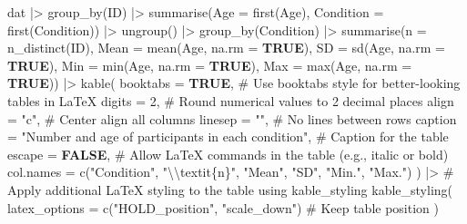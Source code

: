 \documentclass[
  bookmarksnumbered]{article}
\newenvironment{Shaded}{\begin{snugshade}}{\end{snugshade}}
\newcommand{\AttributeTok}[1]{\textcolor[rgb]{0.80,0.80,0.80}{#1}}
\newcommand{\CommentTok}[1]{\textcolor[rgb]{0.50,0.62,0.50}{#1}}
\newcommand{\ConstantTok}[1]{\textcolor[rgb]{0.86,0.64,0.64}{\textbf{#1}}}
\newcommand{\DecValTok}[1]{\textcolor[rgb]{0.86,0.86,0.80}{#1}}
\newcommand{\FunctionTok}[1]{\textcolor[rgb]{0.94,0.94,0.56}{#1}}
\newcommand{\NormalTok}[1]{\textcolor[rgb]{0.80,0.80,0.80}{#1}}
\newcommand{\SpecialCharTok}[1]{\textcolor[rgb]{0.86,0.64,0.64}{#1}}
\newcommand{\StringTok}[1]{\textcolor[rgb]{0.80,0.58,0.58}{#1}}
\begin{document}
\begin{Shaded}
\begin{Highlighting}[]
\NormalTok{dat }\SpecialCharTok{|\textgreater{}} 
  \FunctionTok{group\_by}\NormalTok{(ID) }\SpecialCharTok{|\textgreater{}} 
  \FunctionTok{summarise}\NormalTok{(}\AttributeTok{Age =} \FunctionTok{first}\NormalTok{(Age),}
            \AttributeTok{Condition =} \FunctionTok{first}\NormalTok{(Condition)) }\SpecialCharTok{|\textgreater{}} 
  \FunctionTok{ungroup}\NormalTok{() }\SpecialCharTok{|\textgreater{}} 
  \FunctionTok{group\_by}\NormalTok{(Condition) }\SpecialCharTok{|\textgreater{}} 
  \FunctionTok{summarise}\NormalTok{(}\AttributeTok{n =} \FunctionTok{n\_distinct}\NormalTok{(ID),}
            \AttributeTok{Mean =} \FunctionTok{mean}\NormalTok{(Age, }\AttributeTok{na.rm =} \ConstantTok{TRUE}\NormalTok{),}
            \AttributeTok{SD =} \FunctionTok{sd}\NormalTok{(Age, }\AttributeTok{na.rm =} \ConstantTok{TRUE}\NormalTok{),}
            \AttributeTok{Min =} \FunctionTok{min}\NormalTok{(Age, }\AttributeTok{na.rm =} \ConstantTok{TRUE}\NormalTok{),}
            \AttributeTok{Max =} \FunctionTok{max}\NormalTok{(Age, }\AttributeTok{na.rm =} \ConstantTok{TRUE}\NormalTok{)) }\SpecialCharTok{|\textgreater{}} 
  \FunctionTok{kable}\NormalTok{(}
    \AttributeTok{booktabs =} \ConstantTok{TRUE}\NormalTok{, }\CommentTok{\# Use \textquotesingle{}booktabs\textquotesingle{} style for better{-}looking tables in LaTeX}
    \AttributeTok{digits =} \DecValTok{2}\NormalTok{, }\CommentTok{\# Round numerical values to 2 decimal places}
    \AttributeTok{align =} \StringTok{"c"}\NormalTok{, }\CommentTok{\# Center align all columns}
    \AttributeTok{linesep =} \StringTok{""}\NormalTok{, }\CommentTok{\# No lines between rows}
    \AttributeTok{caption =} \StringTok{"Number and age of participants in each condition"}\NormalTok{,}
    \CommentTok{\# Caption for the table}
    \AttributeTok{escape =} \ConstantTok{FALSE}\NormalTok{, }\CommentTok{\# Allow LaTeX commands in the table (e.g., italic or bold)}
    \AttributeTok{col.names =} \FunctionTok{c}\NormalTok{(}\StringTok{"Condition"}\NormalTok{,}
                  \StringTok{"}\SpecialCharTok{\textbackslash{}\textbackslash{}}\StringTok{textit\{n\}"}\NormalTok{,}
                  \StringTok{"Mean"}\NormalTok{,}
                  \StringTok{"SD"}\NormalTok{,}
                  \StringTok{"Min."}\NormalTok{,}
                  \StringTok{"Max."}\NormalTok{)}
\NormalTok{  ) }\SpecialCharTok{|\textgreater{}}
  \CommentTok{\# Apply additional LaTeX styling to the table using \textquotesingle{}kable\_styling\textquotesingle{}}
  \FunctionTok{kable\_styling}\NormalTok{(}
    \AttributeTok{latex\_options =} \FunctionTok{c}\NormalTok{(}\StringTok{"HOLD\_position"}\NormalTok{, }\StringTok{"scale\_down"}\NormalTok{) }\CommentTok{\# Keep table position}
\NormalTok{  )}
\end{Highlighting}
\end{Shaded}
\end{document}
